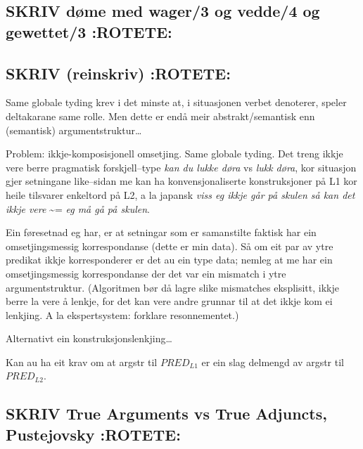 \documentclass[11pt,a4paper,oneside,draft]{book}
\begin{document}
\subsection{\textbf{SKRIV} døme med wager/3 og vedde/4 og gewettet/3 \textbf{:ROTETE:}}
\label{sec-3.12.5}


\subsection{\textbf{SKRIV} (reinskriv) \textbf{:ROTETE:}}
\label{sec-3.12.6}

Same globale tyding krev i det minste at, i situasjonen verbet
denoterer, speler deltakarane same rolle. Men dette er endå meir
abstrakt/semantisk enn (semantisk) argumentstruktur\ldots{}

Problem: ikkje-komposisjonell omsetjing. Same globale tyding. Det
treng ikkje vere berre pragmatisk forskjell--type \emph{kan du lukke døra}
vs \emph{lukk døra}, kor situasjon gjer setningane like--sidan me kan ha
konvensjonaliserte konstruksjoner på L1 kor heile tilsvarer enkeltord
på L2, a la japansk \emph{viss eg ikkje går på skulen så kan det ikkje vere} \~{}= \emph{eg må gå på skulen}. 

Ein føresetnad eg har, er at setningar som er samanstilte faktisk har
ein omsetjingsmessig korrespondanse (dette er min data). Så om eit par
av ytre predikat ikkje korresponderer er det au ein type data; nemleg
at me har ein omsetjingsmessig korrespondanse der det var ein mismatch
i ytre argumentstruktur. (Algoritmen bør då lagre slike mismatches
eksplisitt, ikkje berre la vere å lenkje, for det kan vere andre
grunnar til at det ikkje kom ei lenkjing. A la ekspertsystem: forklare
resonnementet.)

Alternativt ein konstruksjonslenkjing\ldots{} 

Kan au ha eit krav om at argstr til $PRED_{L1}$ er ein slag delmengd av
argstr til $PRED_{L2}$. 
\subsection{\textbf{SKRIV} True Arguments vs True Adjuncts, Pustejovsky \textbf{:ROTETE:}}
\label{sec-3.12.7}
\end{document}
